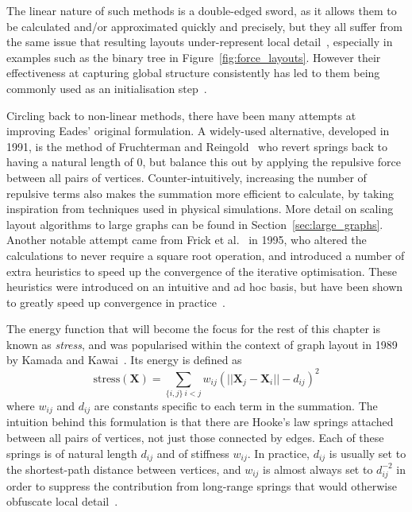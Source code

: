 The linear nature of such methods is a double-edged sword, as it allows them to be calculated and/or approximated quickly and precisely, but they all suffer from the same issue that resulting layouts under-represent local detail~\cite{Brandes2009}, especially in examples such as the binary tree in Figure~\ref{fig:force_layouts}. However their effectiveness at capturing global structure consistently has led to them being commonly used as an initialisation step~\cite{Brandes2009}.

Circling back to non-linear methods, there have been many attempts at improving Eades' original formulation. A widely-used alternative, developed in 1991, is the method of Fruchterman and Reingold~\cite{Fruchterman1991} who revert springs back to having a natural length of 0, but balance this out by applying the repulsive force between all pairs of vertices. Counter-intuitively, increasing the number of repulsive terms also makes the summation more efficient to calculate, by taking inspiration from techniques used in physical simulations. More detail on scaling layout algorithms to large graphs can be found in Section~\ref{sec:large_graphs}.
Another notable attempt came from Frick et al.~\cite{Frick1995} in 1995, who altered the calculations to never require a square root operation, and introduced a number of extra heuristics to speed up the convergence of the iterative optimisation. These heuristics were introduced on an intuitive and ad hoc basis, but have been shown to greatly speed up convergence in practice~\cite{Brandes2001}.

The energy function that will become the focus for the rest of this chapter is known as \emph{stress}, and was popularised within the context of graph layout in 1989 by Kamada and Kawai~\cite{Kamada1989}. Its energy is defined as
\begin{equation}
    \mathrm{stress}(\mathbf{X}) = \sum_{\{i,j\}\:i<j}w_{ij}(||\mathbf{X}_j-\mathbf{X}_i||-d_{ij})^2
\label{eq:stress}
\end{equation}
where $w_{ij}$ and $d_{ij}$ are constants specific to each term in the summation. The intuition behind this formulation is that there are Hooke's law springs attached between all pairs of vertices, not just those connected by edges. Each of these springs is of natural length $d_{ij}$ and of stiffness $w_{ij}$. In practice, $d_{ij}$ is usually set to the shortest-path distance between vertices, and $w_{ij}$ is almost always set to $d_{ij}^{-2}$ in order to suppress the contribution from long-range springs that would otherwise obfuscate local detail~\cite{Brandes2009}.

